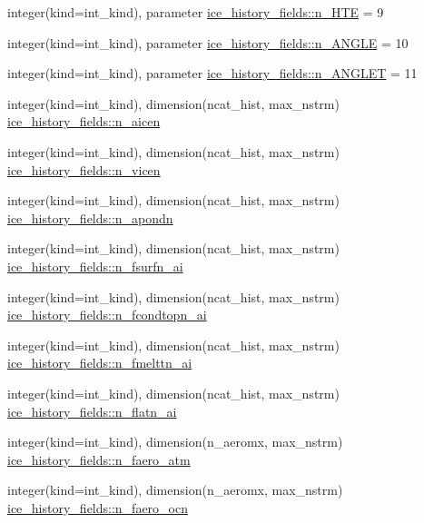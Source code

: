 \begin{DoxyCompactItemize}
\item 
integer(kind=int\_\-kind), parameter \hyperlink{namespaceice__history__fields_ae2441593355b72e80279087bc9b631c3}{ice\_\-history\_\-fields::n\_\-HTE} = 9
\item 
integer(kind=int\_\-kind), parameter \hyperlink{namespaceice__history__fields_a130bc8773e91330b2369823f37e4c9c3}{ice\_\-history\_\-fields::n\_\-ANGLE} = 10
\item 
integer(kind=int\_\-kind), parameter \hyperlink{namespaceice__history__fields_a253f0d4683bb614814edffa539758e3f}{ice\_\-history\_\-fields::n\_\-ANGLET} = 11
\item 
integer(kind=int\_\-kind), dimension(ncat\_\-hist, max\_\-nstrm) \hyperlink{namespaceice__history__fields_a31b00fc2e404e255f40cfa9144865c6f}{ice\_\-history\_\-fields::n\_\-aicen}
\item 
integer(kind=int\_\-kind), dimension(ncat\_\-hist, max\_\-nstrm) \hyperlink{namespaceice__history__fields_afd312fa27e4e7c7979312795eaed3435}{ice\_\-history\_\-fields::n\_\-vicen}
\item 
integer(kind=int\_\-kind), dimension(ncat\_\-hist, max\_\-nstrm) \hyperlink{namespaceice__history__fields_a4d3b9e888569b2534dbceeaf3292b696}{ice\_\-history\_\-fields::n\_\-apondn}
\item 
integer(kind=int\_\-kind), dimension(ncat\_\-hist, max\_\-nstrm) \hyperlink{namespaceice__history__fields_a547e15c8d6d1890d8acb698c12ca6583}{ice\_\-history\_\-fields::n\_\-fsurfn\_\-ai}
\item 
integer(kind=int\_\-kind), dimension(ncat\_\-hist, max\_\-nstrm) \hyperlink{namespaceice__history__fields_a277bf94595092110d32c0719616159fc}{ice\_\-history\_\-fields::n\_\-fcondtopn\_\-ai}
\item 
integer(kind=int\_\-kind), dimension(ncat\_\-hist, max\_\-nstrm) \hyperlink{namespaceice__history__fields_a950d3a5fcd1b660e07bdea0c7d67cecb}{ice\_\-history\_\-fields::n\_\-fmelttn\_\-ai}
\item 
integer(kind=int\_\-kind), dimension(ncat\_\-hist, max\_\-nstrm) \hyperlink{namespaceice__history__fields_aeea32af91b4549502cf55fa0b93f1778}{ice\_\-history\_\-fields::n\_\-flatn\_\-ai}
\item 
integer(kind=int\_\-kind), dimension(n\_\-aeromx, max\_\-nstrm) \hyperlink{namespaceice__history__fields_ac09149d16d9045cc266eff8a26ff0d97}{ice\_\-history\_\-fields::n\_\-faero\_\-atm}
\item 
integer(kind=int\_\-kind), dimension(n\_\-aeromx, max\_\-nstrm) \hyperlink{namespaceice__history__fields_ae402016c2d3706af277fb399ec8f5ec6}{ice\_\-history\_\-fields::n\_\-faero\_\-ocn}

\end{DoxyCompactItemize}
